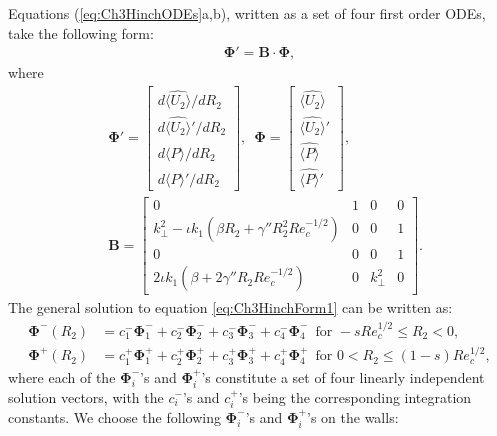 \documentclass{jfm}
\begin{document}
\section{} \label{App:D}
Equations (\ref{eq:Ch3HinchODEs}a,b), written as a set of four first order ODEs, take the following form: 
\begin{align} \label{eq:Ch3HinchForm1}
\bm{\Phi}'=\bm{B}\cdot\bm{\Phi},
\end{align} 
where 
\begin{subequations} \label{eq:Ch3HinchForm2}
	\begin{align}
	&\bm{\Phi}' =\begin{bmatrix}
	d\hat{\langle U_2\rangle}/dR_2 \\
	d\hat{\langle U_2\rangle}'/dR_2 \\
	d \hat{\langle P\rangle}/dR_2 \\
	d \hat{\langle P\rangle}'/dR_2
	\end{bmatrix}, \,\,\,
	\bm{\Phi} =\begin{bmatrix}
	\hat{\langle U_2\rangle} \\
	\hat{\langle U_2\rangle}' \\
	\hat{\langle P\rangle} \\
	\hat{\langle P\rangle}'
	\end{bmatrix}, \\
	&\bm{B}=\begin{bmatrix}
	0 & 1 & 0 & 0\\
	k_\perp^2-\iota k_1(\beta R_2+\gamma''R_2^2 Re_c^{-1/2}) & 0 & 0 & 1 \\
	0 & 0 & 0 & 1 \\
    2\iota k_1 (\beta+2\gamma''R_2 Re_c^{-1/2})  & 0 & k_\perp^2 & 0
	\end{bmatrix}.
	\end{align}
\end{subequations}
The general solution to equation \eqref{eq:Ch3HinchForm1} can be written as:
\begin{align} 
\bm{\Phi}^-(R_2)&=c_1^- \bm{\Phi}_1^- + c_2^- \bm{\Phi}_2^- + c_3^- \bm{\Phi}_3^- + c_4^- \bm{\Phi}_4^-\,\,\,\text{for}\,\,-sRe_c^{1/2}\leq R_2<0,\label{eq:Ch3HinchForm3}\\
\bm{\Phi}^+(R_2)&=c_1^+ \bm{\Phi}_1^+ + c_2^+ \bm{\Phi}_2^+ + c_3^+ \bm{\Phi}_3^+ + c_4^+ \bm{\Phi}_4^+ \,\,\,\text{for}\,\, 0<R_2\leq(1-s)Re_c^{1/2},  \label{eq:Ch3HinchForm4}
\end{align} 
where each of the $\bm{\Phi}_i^-$'s and $\bm{\Phi}_i^+$'s constitute a set of four linearly independent solution vectors, with the $c_i^-$'s and $c_i^+$'s being the corresponding integration constants. We choose the following $\bm{\Phi}_i^-$'s and $\bm{\Phi}_i^+$'s on the walls:
 
\end{document}
